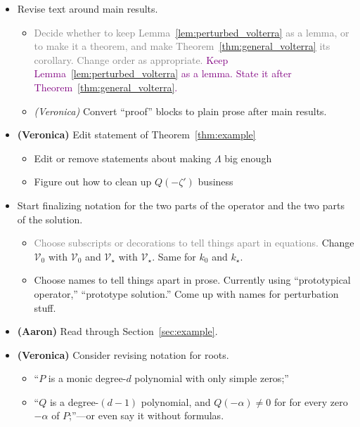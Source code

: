 \documentclass{article}
\theoremstyle{plain}
\newcommand{\volterra}{\mathcal{V}}
\newcommand{\hardpart}{\mathcal{V}_0}
\newcommand{\softpart}{\mathcal{V}_\star}
\newcommand{\hardker}{k_0}
\newcommand{\softker}{k_\star}
\newenvironment{brainstorm}{\color{violet}\begin{itemize}}{\end{itemize}\color{black}}
\begin{document}
\begin{brainstorm}
\begin{itemize}
        \color{violet}
        \item \textbf{(Aaron)} Confirm again that removed $\tau+\epsilon$ upper bound on $\rho$ was unnecessary.
\end{itemize}
\item Revise text around main results.
\begin{itemize}
    \item \textcolor{gray}{Decide whether to keep Lemma~\ref{lem:perturbed_volterra} as a lemma, or to make it a theorem, and make Theorem~\ref{thm:general_volterra} its corollary. Change order as appropriate.} \textcolor{purple}{Keep Lemma~\ref{lem:perturbed_volterra} as a lemma. State it after Theorem~\ref{thm:general_volterra}.}
    \color{gray}
    \item \textit{(Veronica)} Convert ``proof'' blocks to plain prose after main results. 
\end{itemize}
\color{gray}
\item \textbf{(Veronica)} Edit statement of Theorem~\ref{thm:example} 
\begin{itemize}
    \item Edit or remove statements about making $\Lambda$ big enough
    \item Figure out how to clean up $Q(-\zeta')$ business
\end{itemize}
\color{violet}
\item Start finalizing notation for the two parts of the operator and the two parts of the solution.
\begin{itemize}
    \item \textcolor{gray}{Choose subscripts or decorations to tell things apart in equations.} Change $\hardpart$ with $\volterra_0$ and $\softpart$ with $\volterra_\star$. Same for $\hardker$ and $\softker$. 
    \item Choose names to tell things apart in prose. Currently using ``prototypical operator,'' ``prototype solution.'' Come up with names for perturbation stuff.
\end{itemize}
\item \textbf{(Aaron)} Read through Section~\ref{sec:example}.
\color{gray}
\item \textbf{(Veronica)} Consider revising notation for roots. 
\begin{itemize}
\item ``$P$ is a monic degree-$d$ polynomial with only simple zeros;''
\item ``$Q$ is a degree-$(d-1)$ polynomial, and $Q(-\alpha) \neq 0$ for for every zero $-\alpha$ of $P$;''---or even say it without formulas.

\end{itemize}
\end{brainstorm}
\end{document}
